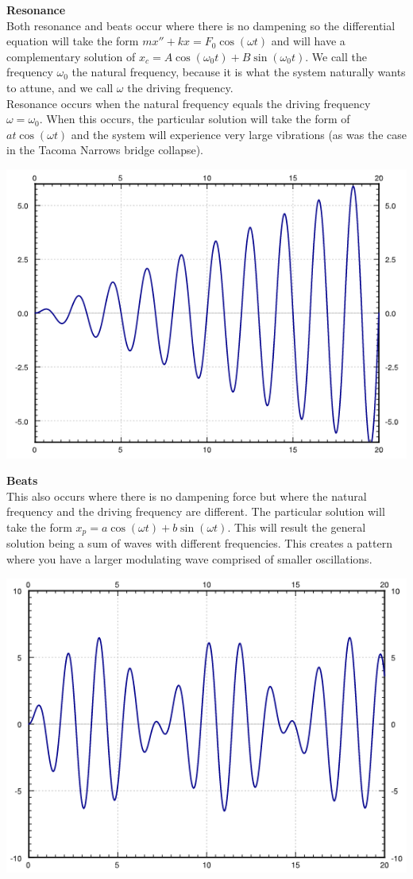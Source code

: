 \documentclass[11pt, fleqn]{article}
\begin{document}
\textbf{Resonance}\\
Both resonance and beats occur where there is no dampening so the differential equation will take the form $mx''+kx=F_0\cos(\omega t)$ and will have a complementary solution of $x_c=A\cos(\omega_0 t)+B\sin(\omega_0 t)$. We call the frequency $\omega_0$ the natural frequency, because it is what the system naturally wants to attune, and we call $\omega$ the driving frequency.\\ Resonance occurs when the natural frequency equals the driving frequency $\omega=\omega_0$. When this occurs, the particular solution will take the form of $at\cos(\omega t)$ and the system will experience very large vibrations (as was the case in the Tacoma Narrows bridge collapse).\\
\centerline{\includegraphics[scale=0.8]{ODEPictures/resonance.png}}

\textbf{Beats}\\
This also occurs where there is no dampening force but where the natural frequency and the driving frequency are different. The particular solution will take the form $x_p=a\cos(\omega t)+b\sin(\omega t)$. This will result the general solution being a sum of waves with different frequencies. This creates a pattern where you have a larger modulating wave comprised of smaller oscillations.\\
\centerline{\includegraphics[scale=0.8]{ODEPictures/Beats.png}}
\end{document}
